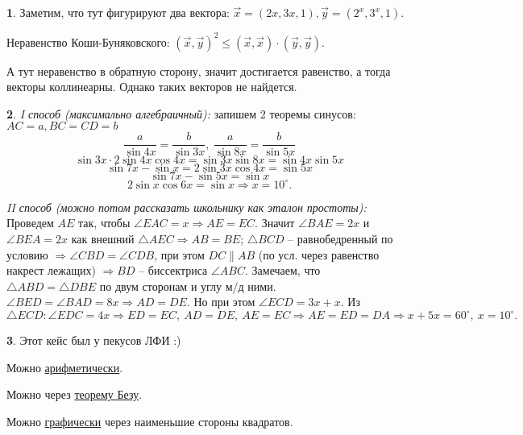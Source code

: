 \documentclass[14pt, a4paper]{extarticle}
\theoremstyle{definition}
\newtheorem{problem}{}
\theoremstyle{definition}
\theoremstyle{remark}
\numberwithin{equation}{section}
\begin{document}
\begin{problem}
    Заметим, что тут фигурируют два вектора: $\vec{x} = (2x, 3x, 1),
    \vec{y} = (2^x, 3^x, 1)$.

    Неравенство Коши-Буняковского: $(\vec{x}, \vec{y})^2 \leqslant
    (\vec{x}, \vec{x}) \cdot (\vec{y}, \vec{y})$.

    А тут неравенство в обратную сторону, значит достигается равенство,
    а тогда векторы коллинеарны. Однако таких векторов не найдется.
\end{problem}

\begin{problem}
    \textit{I способ (максимально алгебраичный):} запишем 2 теоремы синусов:
    $AC = a, BC = CD = b$
    \[\frac{a}{\sin 4x} = \frac{b}{\sin 3x},\ 
    \frac{a}{\sin 8x} = \frac{b}{\sin 5x}\]
    \[\sin 3x \cdot 2 \sin 4x \cos 4x = \sin 3x \sin 8x = \sin 4x \sin 5x\]
    \[\sin 7x - \sin x = 2\sin 3x \cos 4x = \sin 5x\]
    \[\sin 7x - \sin 5x = \sin x\]
    \[2 \sin x \cos 6x = \sin x \Rightarrow x = 10^\circ.\]

    \textit{II способ (можно потом рассказать школьнику как эталон простоты):}
    Проведем $AE$ так, чтобы $\angle EAC = x \Rightarrow AE = EC.$ Значит 
    $\angle BAE = 2x$ и $\angle BEA = 2x$ как внешний $\triangle AEC \Rightarrow
    AB = BE$; $\triangle BCD$ -- равнобедренный по условию $\Rightarrow 
    \angle CBD = \angle CDB$, при этом $DC \parallel AB$ (по усл. через равенство 
    накрест лежащих) $\Rightarrow BD$ -- биссектриса $\angle ABC$.
    Замечаем, что $\triangle ABD = \triangle DBE$ по двум сторонам и углу м/д ними.
    $\angle BED = \angle BAD = 8x \Rightarrow AD = DE.$ Но при этом $\angle ECD = 3x + x$.
    Из $\triangle ECD: \angle EDC = 4x \Rightarrow ED = EC,\ AD = DE,\ AE = EC
    \Rightarrow AE = ED = DA \Rightarrow x + 5x = 60^\circ,\ x = 10^\circ.$ 
\end{problem}

\begin{problem}
    Этот кейс был у пекусов ЛФИ :)

    Можно \href{https://youtu.be/SSUCYC-nF6g}{арифметически}.

    Можно через \href{https://youtu.be/UdVr4Ak-E78}{теорему Безу}.

    Можно \href{https://youtu.be/-Gik7bfQxDM}{графически} через наименьшие стороны квадратов.
\end{problem}
\end{document}
